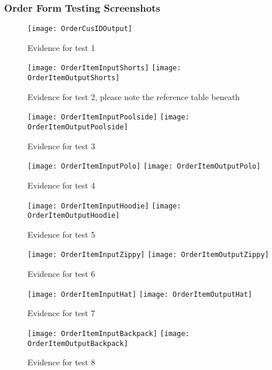 \documentclass[
11pt, %
a4paper, %
oneside, %
headinclude,footinclude, %
BCOR5mm, %
]{scrartcl}
\begin{document}
\begin{appendices}
{{{{{{{{{{{{{{\subsubsection{Order Form Testing Screenshots}
\begin{figure}[H]
	\centering
	\texttt{[image: OrderCusIDOutput]}
	\caption[Evidence C.1.2 Test 1]{Evidence for test 1}
	\label{orddettes1}
\end{figure}
\begin{figure}[H]
	\centering
	\texttt{[image: OrderItemInputShorts]}
	\texttt{[image: OrderItemOutputShorts]}
	\caption[Evidence C.1.2 Test 2]{Evidence for test 2, please note the reference table beneath}
	\label{orddettes2}
\end{figure}
\begin{figure}[H]
	\centering
	\texttt{[image: OrderItemInputPoolside]}
	\texttt{[image: OrderItemOutputPoolside]}
	\caption[Evidence C.1.2 Test 3]{Evidence for test 3}
	\label{orddettes3}
\end{figure}
\begin{figure}[H]
	\centering
	\texttt{[image: OrderItemInputPolo]}
	\texttt{[image: OrderItemOutputPolo]}
	\caption[Evidence C.1.2 Test 4]{Evidence for test 4}
	\label{orddettes4}
\end{figure}
\begin{figure}[H]
	\centering
	\texttt{[image: OrderItemInputHoodie]}
	\texttt{[image: OrderItemOutputHoodie]}
	\caption[Evidence C.1.2 Test 5]{Evidence for test 5}
	\label{orddettes5}
\end{figure}
\begin{figure}[H]
	\centering
	\texttt{[image: OrderItemInputZippy]}
	\texttt{[image: OrderItemOutputZippy]}
	\caption[Evidence C.1.2 Test 6]{Evidence for test 6}
	\label{orddettes6}
\end{figure}
\begin{figure}[H]
	\centering
	\texttt{[image: OrderItemInputHat]}
	\texttt{[image: OrderItemOutputHat]}
	\caption[Evidence C.1.2 Test 7]{Evidence for test 7}
	\label{orddettes7}
\end{figure}
\begin{figure}[H]
	\centering
	\texttt{[image: OrderItemInputBackpack]}
	\texttt{[image: OrderItemOutputBackpack]}
	\caption[Evidence C.1.2 Test 8]{Evidence for test 8}

\end{figure}}}}}}}}}}}}}}}
\end{appendices}
\end{document}

